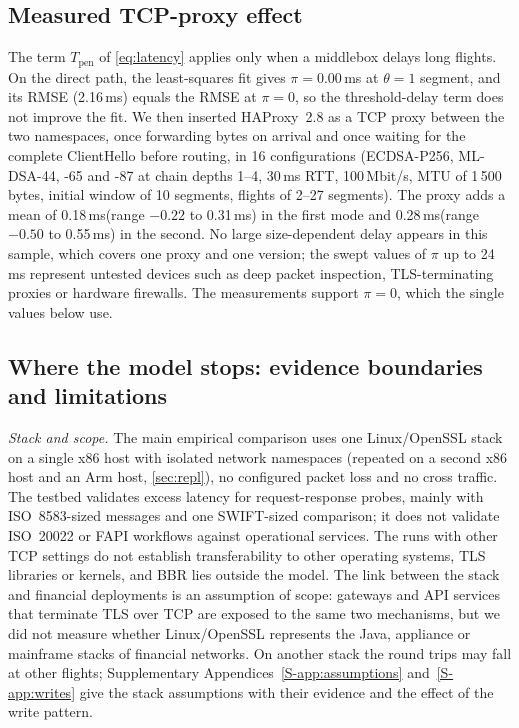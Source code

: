 \documentclass[preprint,12pt]{elsarticle}
\newcommand{\ms}{\,ms\xspace}
\newcommand{\Mbits}{\,Mbit/s\xspace}
\begin{document}
\subsection{Measured TCP-proxy effect}
The term $T_\mathrm{pen}$ of \cref{eq:latency} applies only when a middlebox delays long flights. On the direct path, the least-squares fit gives $\pi=0.00$\ms at $\theta=1$ segment, and its RMSE (2.16\ms) equals the RMSE at $\pi=0$, so the threshold-delay term does not improve the fit. We then inserted HAProxy~2.8 as a TCP proxy between the two namespaces, once forwarding bytes on arrival and once waiting for the complete ClientHello before routing, in 16 configurations (ECDSA-P256, ML-DSA-44, -65 and -87 at chain depths 1--4, 30\ms RTT, 100\Mbits, MTU of 1\,500\,bytes, initial window of 10 segments, flights of 2--27 segments). The proxy adds a mean of 0.18\ms (range $-0.22$ to 0.31\ms) in the first mode and 0.28\ms (range $-0.50$ to 0.55\ms) in the second. No large size-dependent delay appears in this sample, which covers one proxy and one version; the swept values of $\pi$ up to 24\ms represent untested devices such as deep packet inspection, TLS-terminating proxies or hardware firewalls. The measurements support $\pi=0$, which the single values below use.

\subsection{Where the model stops: evidence boundaries and limitations}
\label{sec:limits}
\emph{Stack and scope.} The main empirical comparison uses one Linux/OpenSSL stack on a single x86 host with isolated network namespaces (repeated on a second x86 host and an Arm host, \cref{sec:repl}), no configured packet loss and no cross traffic. The testbed validates excess latency for request-response probes, mainly with ISO~8583-sized messages and one SWIFT-sized comparison; it does not validate ISO~20022 or FAPI workflows against operational services. The runs with other TCP settings do not establish transferability to other operating systems, TLS libraries or kernels, and BBR lies outside the model. The link between the stack and financial deployments is an assumption of scope: gateways and API services that terminate TLS over TCP are exposed to the same two mechanisms, but we did not measure whether Linux/OpenSSL represents the Java, appliance or mainframe stacks of financial networks. On another stack the round trips may fall at other flights; Supplementary Appendices~\ref{S-app:assumptions} and~\ref{S-app:writes} give the stack assumptions with their evidence and the effect of the write pattern.
\end{document}
